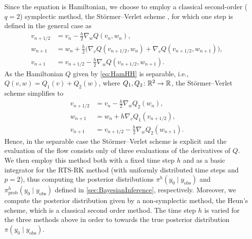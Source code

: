 \documentclass[10pt]{article}
\begin{document}
Since the equation is Hamiltonian, we choose to employ a classical second-order ($q = 2$) symplectic method, the Störmer--Verlet scheme \cite{Sto07, Ver67, HLW06}, for which one step is defined in the general case as
\begin{equation}
\begin{aligned}
v_{n+1/2} &= v_n - \frac{h}{2} \nabla_w Q(v_n, w_n), \\
w_{n+1} &= w_n + \frac{h}{2} \big(\nabla_v Q(v_{n+1/2}, w_n) + \nabla_v Q(v_{n+1/2}, w_{n+1})\big),\\
v_{n+1} &= v_{n+1/2} - \frac{h}{2} \nabla_w Q(v_{n+1/2}, w_{n+1}).
\end{aligned}
\end{equation}
As the Hamiltonian $Q$ given by \eqref{eq:HamHH} is separable, i.e., $Q(v, w) = Q_1(v) + Q_2(w)$, where $Q_1, Q_2 \colon \mathbb{R}^2 \to \mathbb{R}$, the Störmer--Verlet scheme simplifies to
\begin{equation}
\begin{aligned}
v_{n+1/2} &= v_n - \frac{h}{2} \nabla_w Q_2(w_n), \\
w_{n+1} &= w_n + h \nabla_v Q_1(v_{n+1/2}),\\
v_{n+1} &= v_{n+1/2} - \frac{h}{2} \nabla_w Q_2(w_{n+1}).
\end{aligned}
\end{equation}
Hence, in the separable case the Störmer--Verlet scheme is explicit and the evaluation of the flow consists only of three evaluations of the derivatives of $Q$. We then employ this method both with a fixed time step $h$ and as a basic integrator for the RTS-RK method (with uniformly distributed time steps and $p = 2$), thus computing the posterior distributions $\pi^h(y_0 \mid y_{\mathrm{obs}})$ and $\pi^h_{\mathrm{prob}}(y_0 \mid y_{\mathrm{obs}})$ defined in \cref{sec:BayesianInference}, respectively. Moreover, we compute the posterior distribution given by a non-symplectic method, the Heun's scheme, which is a classical second order method. The time step $h$ is varied for the three methods above in order to  towards the true posterior distribution $\pi(y_0 \mid y_{\mathrm{obs}})$.
\end{document}
